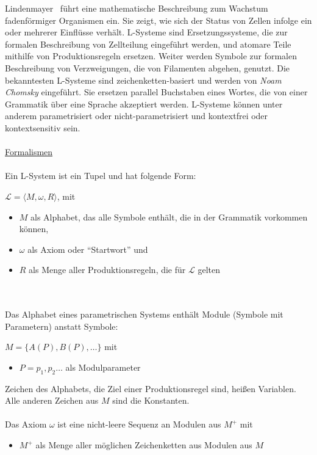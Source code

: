 Lindenmayer~\cite{lindemayer_1968} führt eine mathematische Beschreibung zum Wachstum fadenförmiger Organismen ein.
Sie zeigt, wie sich der Status von Zellen infolge ein oder mehrerer Einflüsse verhält.
L-Systeme sind Ersetzungssysteme, die zur formalen Beschreibung von Zellteilung eingeführt werden, und atomare Teile
mithilfe von Produktionsregeln ersetzen.
Weiter werden Symbole zur formalen Beschreibung von Verzweigungen, die von Filamenten abgehen, genutzt.
Die bekanntesten L-Systeme sind zeichenketten-basiert und werden von \textit{Noam Chomsky} eingeführt.
Sie ersetzen parallel Buchstaben eines Wortes, die von einer Grammatik über eine Sprache akzeptiert werden.
L-Systeme können unter anderem parametrisiert oder nicht-parametrisiert und kontextfrei oder kontextsensitiv sein.
\\~\\
\underline{Formalismen}\\~\\
Ein L-System ist ein Tupel und hat folgende Form:
\begin{center}
    $\mathcal{L}=\langle M,\omega,R \rangle$, mit
\end{center}
\begin{itemize}
    \item $M$ als Alphabet, das alle Symbole enthält, die in der Grammatik vorkommen können,
    \item $\omega$ als Axiom oder "`Startwort"' und
    \item $R$ als Menge aller Produktionsregeln, die für $\mathcal{L}$ gelten
\end{itemize}
\\~\\
Das Alphabet eines parametrischen Systems enthält Module (Symbole mit Parametern) anstatt Symbole:
\begin{center}
    $M=\{A(P),B(P),\dots\}$ mit
\end{center}
\begin{itemize}
    \item $P=p_1,p_2\dots$ als Modulparameter
\end{itemize}
Zeichen des Alphabets, die Ziel einer Produktionsregel sind, heißen Variablen.
Alle anderen Zeichen aus $M$ sind die Konstanten.
\\~\\
Das Axiom $\omega$ ist eine nicht-leere Sequenz an Modulen aus $M^+$ mit
\begin{itemize}
    \item $M^+$ als Menge aller möglichen Zeichenketten aus Modulen aus $M$
\end{itemize}
